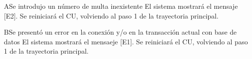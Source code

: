 \begin{UCtrayectoriaA}{A}{Se introdujo un número de multa inexistente}	
			\UCpaso[\UCsist] El sistema mostrará el mensaje [E2].
			\UCpaso[\UCsist] Se reiniciará el CU, volviendo al paso 1 de la trayectoria principal. 
\end{UCtrayectoriaA}
\begin{UCtrayectoriaA}{B}{Se presentó un error en la conexión y/o en la transacción actual con base de datos}
			\UCpaso[\UCsist] El sistema mostrará el mensaeje [E1].
			\UCpaso[\UCsist] Se reiniciará el CU, volviendo al paso 1 de la trayectoria principal.
\end{UCtrayectoriaA}